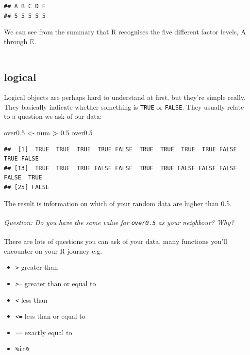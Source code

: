 \documentclass[
]{book}
\newenvironment{Shaded}{\begin{snugshade}}{\end{snugshade}}
\newcommand{\FloatTok}[1]{\textcolor[rgb]{0.00,0.00,0.81}{#1}}
\newcommand{\NormalTok}[1]{#1}
\newcommand{\OperatorTok}[1]{\textcolor[rgb]{0.81,0.36,0.00}{\textbf{#1}}}
\newcommand{\StringTok}[1]{\textcolor[rgb]{0.31,0.60,0.02}{#1}}
\providecommand{\tightlist}{%
  \setlength{\itemsep}{0pt}\setlength{\parskip}{0pt}}
\begin{document}
\begin{verbatim}
## A B C D E 
## 5 5 5 5 5
\end{verbatim}

We can see from the summary that R recognises the five different factor levels,
A through E.\\
~\\

\hypertarget{logical}{%
\subsection{logical}\label{logical}}

Logical objects are perhaps hard to understand at first, but they're simple
really. They basically indicate whether something is \texttt{TRUE} or \texttt{FALSE}. They
usually relate to a question we ask of our data:

\begin{Shaded}
\begin{Highlighting}[]
\NormalTok{over0}\FloatTok{.5}\NormalTok{ <-}\StringTok{ }\NormalTok{num }\OperatorTok{>}\StringTok{ }\FloatTok{0.5}
\NormalTok{over0}\FloatTok{.5}
\end{Highlighting}
\end{Shaded}

\begin{verbatim}
##  [1]  TRUE  TRUE  TRUE  TRUE FALSE  TRUE  TRUE  TRUE  TRUE FALSE  TRUE FALSE
## [13]  TRUE  TRUE  TRUE FALSE FALSE  TRUE  TRUE FALSE FALSE FALSE FALSE  TRUE
## [25] FALSE
\end{verbatim}

The result is information on which of your random data are higher than 0.5.\\
~\\

\emph{Question: Do you have the same value for \texttt{over0.5} as your neighbour? Why?}\\
~\\

There are lots of questions you can ask of your data, many functions you'll
encounter on your R journey e.g.~

\begin{itemize}
\tightlist
\item
  \texttt{\textgreater{}} greater than
\item
  \texttt{\textgreater{}=} greater than or equal to
\item
  \texttt{\textless{}} less than
\item
  \texttt{\textless{}=} less than or equal to
\item
  \texttt{==} exactly equal to
\item
  \texttt{\%in\%}~\\
\end{itemize}
\end{document}
